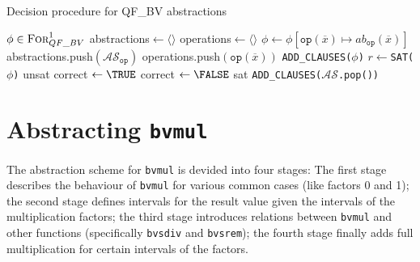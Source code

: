 \begin{algorithm}
    \caption{Decision procedure for QF\_BV abstractions}
    \begin{algorithmic}
    \label{algorithm:refinement_approach:abstraction_scheme:refinement}
    \REQUIRE $\phi \in \textsc{For}^1_{QF\_BV}$
    \STATE abstractions$ \leftarrow \langle\rangle$
    \STATE operations$ \leftarrow \langle\rangle$
                \STATE $\phi \leftarrow \phi\left[\texttt{op}\left(\overline{x}\right) \mapsto ab_\texttt{op}\left(\overline{x}\right)\right]$
                \STATE abstractions.push$\left(\mathcal{AS}_\texttt{op}\right)$
                \STATE operations.push$\left( \texttt{op}\left(\overline{x}\right) \right)$
            \ENDFOR
        \ENDIF
    \ENDFOR
    \STATE \texttt{ADD\_CLAUSES($\phi$)}
    \LOOP
    \STATE $r \leftarrow $\texttt{SAT($\phi$)}
        \PRINT unsat
    \ELSE
        \STATE correct $\leftarrow \TRUE$
                \STATE correct $\leftarrow \FALSE$
            \ENDIF
        \ENDFOR
            \PRINT sat
        \ELSE
                \STATE \texttt{ADD\_CLAUSES($\mathcal{AS}$.pop())}
            \ENDFOR
        \ENDIF
    \ENDIF
    \ENDLOOP
    \end{algorithmic}
\end{algorithm}

\section{Abstracting \texttt{bvmul}}
The abstraction scheme for \texttt{bvmul} is devided into four stages:
The first stage describes the behaviour of \texttt{bvmul} for various common cases (like factors 0 and 1);
the second stage defines intervals for the result value given the intervals of the multiplication factors;
the third stage introduces relations between \texttt{bvmul} and other functions (specifically \texttt{bvsdiv} and \texttt{bvsrem});
the fourth stage finally adds full multiplication for certain intervals of the factors.

